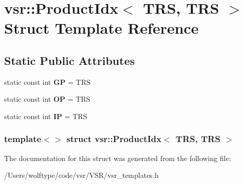 \hypertarget{structvsr_1_1_product_idx_3_01_t_r_s_00_01_t_r_s_01_4}{\section{vsr\-:\-:Product\-Idx$<$ T\-R\-S, T\-R\-S $>$ Struct Template Reference}
\label{structvsr_1_1_product_idx_3_01_t_r_s_00_01_t_r_s_01_4}
}
\subsection*{Static Public Attributes}
\begin{DoxyCompactItemize}
\item 
\hypertarget{structvsr_1_1_product_idx_3_01_t_r_s_00_01_t_r_s_01_4_ae3ba69b5d0bfc75b1f51ff8dad38901f}{static const int {\bfseries G\-P} = T\-R\-S}\label{structvsr_1_1_product_idx_3_01_t_r_s_00_01_t_r_s_01_4_ae3ba69b5d0bfc75b1f51ff8dad38901f}

\item 
\hypertarget{structvsr_1_1_product_idx_3_01_t_r_s_00_01_t_r_s_01_4_a79919ec633acc5bc26cc06a635cf0deb}{static const int {\bfseries O\-P} = T\-R\-S}\label{structvsr_1_1_product_idx_3_01_t_r_s_00_01_t_r_s_01_4_a79919ec633acc5bc26cc06a635cf0deb}

\item 
\hypertarget{structvsr_1_1_product_idx_3_01_t_r_s_00_01_t_r_s_01_4_a12d5a3c2bd49bb61c51ece62918319e4}{static const int {\bfseries I\-P} = T\-R\-S}\label{structvsr_1_1_product_idx_3_01_t_r_s_00_01_t_r_s_01_4_a12d5a3c2bd49bb61c51ece62918319e4}

\end{DoxyCompactItemize}
\subsubsection*{template$<$$>$ struct vsr\-::\-Product\-Idx$<$ T\-R\-S, T\-R\-S $>$}



The documentation for this struct was generated from the following file\-:\begin{DoxyCompactItemize}
\item 
/\-Users/wolftype/code/vsr/\-V\-S\-R/vsr\-\_\-templates.\-h\end{DoxyCompactItemize}
